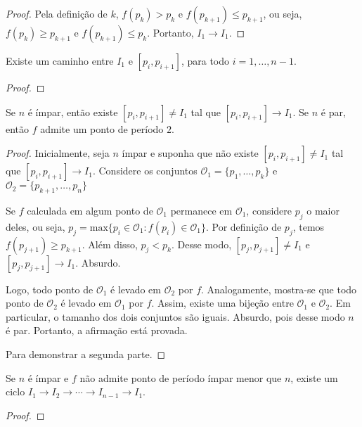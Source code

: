 \begin{definition}
\begin{proof}
Pela definição de $k$, $f(p_k) > p_k$ e $f(p_{k+1}) \leq p_{k+1}$, ou seja, $f(p_k) \geq p_{k+1}$ e $f(p_{k+1}) \leq p_k$. Portanto, $I_1 \longrightarrow I_1$.
\end{proof}

\begin{lemma}
Existe um caminho entre $I_1$ e $[p_i, p_{i+1}]$, para todo $i = 1, \dots, n-1$.
\end{lemma}

\begin{proof}
\end{proof}

\begin{lemma}
Se $n$ é ímpar, então existe $[p_i, p_{i+1}]  \neq I_1$  tal que $[p_i, p_{i+1}] \longrightarrow I_1$. Se $n$ é par, então $f$ admite um ponto de período $2$.
\end{lemma}

\begin{proof}
Inicialmente, seja $n$ ímpar e suponha que não existe $[p_i, p_{i+1}] \neq I_1$  tal que $[p_i, p_{i+1}] \longrightarrow I_1$. Considere os conjuntos $\mathcal{O}_1 = \{p_1, \dots, p_k\}$ e $\mathcal{O}_2 = \{p_{k+1}, \dots, p_n\}$

Se $f$ calculada em algum ponto de $\mathcal{O}_1$ permanece em $\mathcal{O}_1$, considere $p_j$ o maior deles, ou seja, $p_j = \textrm{max}\{p_i \in \mathcal{O}_1 : f(p_i) \in \mathcal{O}_1\}$. Por definição de $p_j$, temos $f(p_{j+1}) \geq p_{k+1}$. Além disso, $p_j < p_k$. Desse modo, $[p_j, p_{j+1}] \neq I_1$ e $[p_j, p_{j+1}] \longrightarrow I_1$. Absurdo.

Logo, todo ponto de $\mathcal{O}_1$ é levado em $\mathcal{O}_2$ por $f$. Analogamente, mostra-se que todo ponto de $\mathcal{O}_2$ é levado em $\mathcal{O}_1$ por $f$. Assim, existe uma bijeção entre $\mathcal{O}_1$ e $\mathcal{O}_2$. Em particular, o tamanho dos dois conjuntos  são iguais. Absurdo, pois desse modo $n$ é par. Portanto, a afirmação está provada. 

Para demonstrar a segunda parte.
\end{proof}

\begin{lemma}
Se $n$ é ímpar e $f$ não admite ponto de período ímpar menor que $n$, existe um ciclo $I_1 \longrightarrow I_2 \longrightarrow \cdots \longrightarrow I_{n-1} \longrightarrow I_1$.
\end{lemma}

\begin{proof}
\end{proof}


\end{definition}
